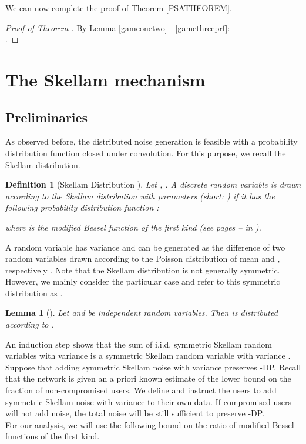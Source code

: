 \documentclass[10pt]{extarticle}
\newtheorem{Lem}[Thm]{Lemma}
\newtheorem{Def}{Definition}
\begin{document}
\noindent We can now complete the proof of Theorem \ref{PSATHEOREM}.

\begin{proof}[Proof of Theorem ]  By Lemma \ref{gameonetwo} - \ref{gamethreeprf}:\\
.
\end{proof}






\section{The Skellam mechanism}\label{skellamsec}

\subsection{Preliminaries}

As observed before, the distributed noise generation is feasible with a probability distribution function closed under convolution. For this purpose, we recall the Skellam distribution.


\begin{Def}[Skellam Distribution \cite{29}]\label{skellam} Let , . A discrete random variable  is drawn according to the Skellam distribution with parameters  (short: ) if it has the following probability distribution function :

where  is the modified Bessel function of the first kind (see pages -- in ).
\end{Def}

A random variable  has variance  and can be generated as the difference of two random variables drawn according to the Poisson distribution of mean  and , respectively \cite{29}. Note that the Skellam distribution is not generally symmetric. However, we mainly consider the particular case  and refer to this symmetric distribution as .


\begin{Lem}[\cite{29}]\label{sksum} Let  and  be independent random variables. Then  is distributed according to .
\end{Lem}

An induction step shows that the sum of  i.i.d. symmetric Skellam random variables with variance  is a symmetric Skellam random variable with variance . Suppose that adding symmetric Skellam noise with variance  preserves -\mbox{\upshape\sffamily DP}. Recall that the network is given an a priori known estimate  of the lower bound on the fraction of non-compromised users. We define  and instruct the users to add symmetric Skellam noise with variance  to their own data. If compromised users will not add noise, the total noise will be still sufficient to preserve -\mbox{\upshape\sffamily DP}.\\ 
For our analysis, we will use the following bound on the ratio of modified Bessel functions of the first kind.
\end{document}
